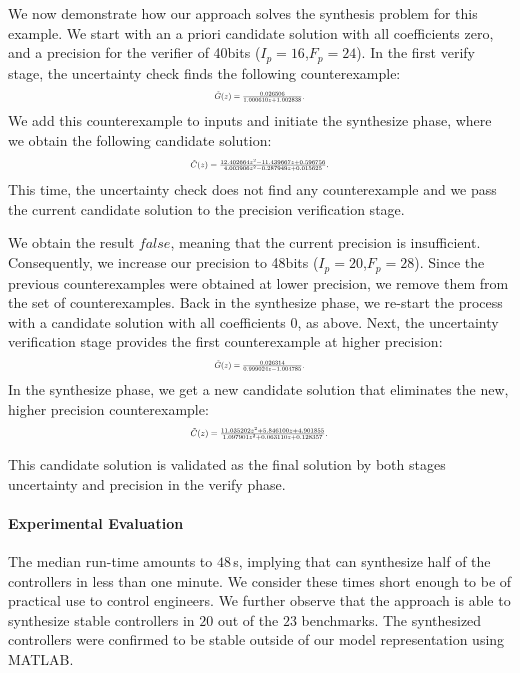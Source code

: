 \documentclass[final]{sig-alternate-05-2015}
\begin{document}
We now demonstrate how our approach solves the synthesis problem for this
example.  We start with an a priori candidate solution
with all coefficients zero, and a precision for the verifier of 40bits ($I_p=16$,$F_p=24$).
In the first {\sc verify} stage, the {\sc uncertainty} 
check finds the following counterexample:
%
$$ 
\resizebox{.2\textwidth}{!}{
$\tilde G(z) = \frac{0.026506}{1.000610z+1.002838}$. 
}
$$
We add this counterexample to {\sc inputs} and initiate the {\sc synthesize}
phase, where we obtain the following candidate solution:
%
$$
\resizebox{.3\textwidth}{!}{
$\tilde{C}(z)=\frac{12.402664z^2{-}11.439667z{+}0.596756}{4.003906z^2{-}0.287949z{+}0.015625}.$
}
$$ 
This time, the {\sc uncertainty} check does not find any
counterexample and we pass the current candidate solution to the {\sc
precision} verification stage.

We obtain the result $\mathit{false}$, meaning that the current precision is
insufficient.  Consequently, we increase our precision to 48bits ($I_p=20$,$F_p=28$).
%
Since the previous counterexamples were obtained at lower precision, we
remove them from the set of counterexamples.  Back in the {\sc synthesize}
phase, we re-start the process with a candidate solution with all
coefficients $0$, as above.  Next, the {\sc uncertainty} verification stage provides
the first counterexample at higher precision:
$$ 
\resizebox{.2\textwidth}{!}{
$\tilde G(z) = \frac{0.026314}{0.999024z{-}1.004785}$. 
}$$
In the {\sc synthesize} phase, we get a new candidate solution that
eliminates the new, higher precision counterexample:
%
$$ 
\resizebox{.3\textwidth}{!}{
$\tilde{C}(z)=\frac{11.035202z^2{+}5.846100z{+}4.901855}{1.097901z^2{+}0.063110z{+}0.128357}$. 
}$$

This candidate solution is validated  as the final solution by both stages
{\sc uncertainty} and {\sc precision} in the {\sc verify} phase. 

\paragraph{Experimental Evaluation}\label{sec:experiments}

The median run-time amounts to $48$\,s, implying that \tool can synthesize half of the controllers 
in less than one minute. We consider these times short enough to be of practical use to control
engineers.  We further observe that the approach is able to synthesize stable controllers
in $20$ out of the $23$ benchmarks.  The synthesized controllers were confirmed to be stable
outside of our model representation using MATLAB.


  
\end{document}

